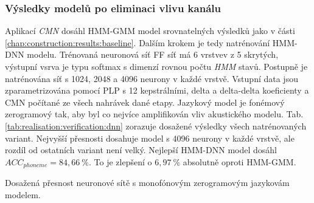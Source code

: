 \subsubsection{Výsledky modelů po eliminaci vlivu kanálu}

Aplikací \textit{CMN} dosáhl HMM-GMM model srovnatelných výsledků jako v části \ref{chap:construction:results:baseline}. Dalším krokem je tedy natrénování HMM-DNN modelu.
Trénovaná neuronová síť FF síť má 6 vrstvev z 5 skrytých, výstupní vsrva je typu softmax s dimenzí rovnou počtu \textit{HMM} stavů. Postupně je natrénována síť s 1024, 2048 a 4096 neurony v každé vrstvě. Vstupní data jsou zparametrizována pomocí PLP s 12 kepstrálními, delta a delta-delta koeficienty a CMN počítané ze všech nahrávek dané etapy. Jazykový model je fonémový zerogramový tak, aby byl co nejvíce amplifikován vliv akustického modelu. Tab. \ref{tab:realisation:verification:dnn} zorazuje dosažené výsledky všech natrénovaných variant. Nejvyšší přesnosti dosahuje model s 4096 neurony v každé vrstvě, ale rozdíl od ostatních variant není velký. Nejlepší HMM-DNN model dosáhl $ACC_{phoneme} = 84,66\ \%$. To je zlepšení o $6,97\ \%$ absolutně oproti HMM-GMM.

\begin{table}[htpb]
  \centering
  \def\arraystretch{1.5}
  \caption{Dosažená přesnost neuronové sítě s monofónovým zerogramovým jazykovám modelem.}
  \label{tab:realisation:verification:dnn}
\end{table}
